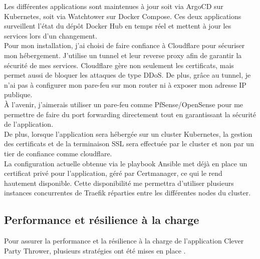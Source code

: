 Les différentes applications sont maintenues à jour soit via ArgoCD sur Kubernetes, soit via Watchtower sur Docker Compose.
Ces deux applications surveillent l'état du dépôt Docker Hub en temps réel et mettent à jour les services lors d'un changement.\\

Pour mon installation, j'ai choisi de faire confiance à Cloudflare pour sécuriser mon hébergement.
J'utilise un tunnel et leur reverse proxy afin de garantir la sécurité de mes services.
Cloudflare gère non seulement les certificats, mais permet aussi de bloquer les attaques de type DDoS. De plus, grâce au tunnel,
je n'ai pas à configurer mon pare-feu sur mon router ni à exposer mon adresse IP publique.\\

À l'avenir, j'aimerais utiliser un pare-feu comme PfSense/OpenSense pour me permettre de faire du port forwarding directement
tout en garantissant la sécurité de l'application.\\

De plus, lorsque l'application sera hébergée sur un cluster Kubernetes, la gestion des certificats et de la terminaison
SSL sera effectuée par le cluster et non par un tier de confiance comme cloudflare.\\

La configuration actuelle obtenue via le playbook Ansible met déjà en place un certificat privé pour l'application, géré par Certmanager,
ce qui le rend hautement disponible.
Cette disponibilité me permettra d'utiliser plusieurs instances concurrentes de Traefik réparties entre les différentes nodes du cluster.

\subsection{Performance et résilience à la charge}\label{subsec:performance-et-resilience}

Pour assurer la performance et la résilience à la charge de l'application Clever Party Thrower, plusieurs stratégies ont été mises en place .\\

